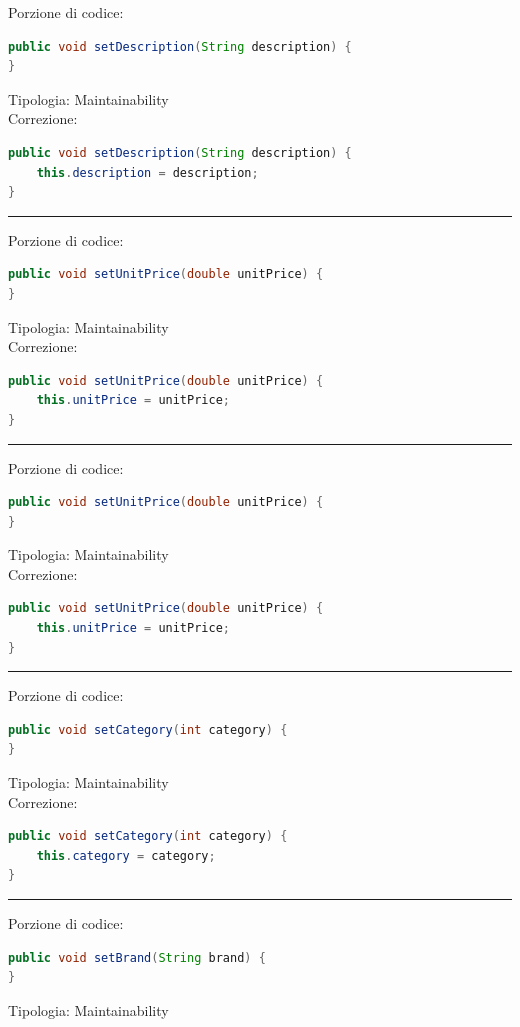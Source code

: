\documentclass{article}
\begin{document}
Porzione di codice:
\begin{lstlisting}[language=Java]
public void setDescription(String description) {
}
\end{lstlisting}
Tipologia: Maintainability\\
Correzione:
\begin{lstlisting}[language=Java]
public void setDescription(String description) {
    this.description = description;
}
\end{lstlisting}
\vspace{.5em}\hrule\vspace{.5em}
Porzione di codice:
\begin{lstlisting}[language=Java]
public void setUnitPrice(double unitPrice) {
}
\end{lstlisting}
Tipologia: Maintainability\\
Correzione:
\begin{lstlisting}[language=Java]
public void setUnitPrice(double unitPrice) {
    this.unitPrice = unitPrice;
}
\end{lstlisting}
\vspace{.5em}\hrule\vspace{.5em}
Porzione di codice:
\begin{lstlisting}[language=Java]
public void setUnitPrice(double unitPrice) {
}
\end{lstlisting}
Tipologia: Maintainability\\
Correzione:
\begin{lstlisting}[language=Java]
public void setUnitPrice(double unitPrice) {
    this.unitPrice = unitPrice;
}
\end{lstlisting}
\vspace{.5em}\hrule\vspace{.5em}
Porzione di codice:
\begin{lstlisting}[language=Java]
public void setCategory(int category) {
}
\end{lstlisting}
Tipologia: Maintainability\\
Correzione:
\begin{lstlisting}[language=Java]
public void setCategory(int category) {
    this.category = category;
}
\end{lstlisting}
\vspace{.5em}\hrule\vspace{.5em}
Porzione di codice:
\begin{lstlisting}[language=Java]
public void setBrand(String brand) {
}
\end{lstlisting}
Tipologia: Maintainability\\
\end{document}

